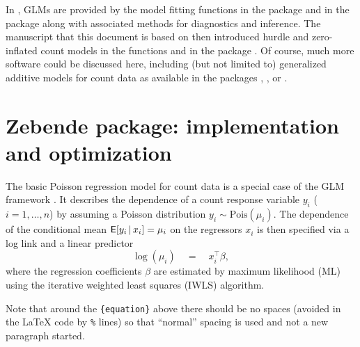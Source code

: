 \documentclass[article]{jss}
\newcommand{\fct}[1]{\code{#1()}}
\begin{document}
In  \citep{R}, GLMs are provided by the model fitting functions
\fct{glm} in the  package and \fct{glm.nb} in the  package
\citep[][Chapter~7.4]{Venables+Ripley:2002} along with associated methods for
diagnostics and inference. The manuscript that this document is based on
\citep{Zeileis+Kleiber+Jackman:2008} then introduced hurdle and zero-inflated
count models in the functions \fct{hurdle} and \fct{zeroinfl} in the 
package \citep{Jackman:2015}. Of course, much more software could be discussed
here, including (but not limited to) generalized additive models for count data
as available in the  packages  \cite{Wood:2006},
 \citep{Stasinopoulos+Rigby:2007}, or  \citep{Yee:2009}.




\section{Zebende package: implementation and optimization} \label{sec:optimization}

The basic Poisson regression model for count data is a special case of the GLM
framework \cite{McCullagh+Nelder:1989}. It describes the dependence of a count
response variable $y_i$ ($i = 1, \dots, n$) by assuming a Poisson distribution
$y_i \sim \mathrm{Pois}(\mu_i)$. The dependence of the conditional mean
$\mathsf{E}[y_i \, | \, x_i] = \mu_i$ on the regressors $x_i$ is then specified via a
log link and a linear predictor
%
\begin{equation} \label{eq:mean}
  \log(\mu_i) \quad = \quad x_i^\top \beta,
\end{equation}
%
where the regression coefficients $\beta$ are estimated by maximum likelihood
(ML) using the iterative weighted least squares (IWLS) algorithm.

\begin{leftbar}
  Note that around the \verb|{equation}| above there should be no spaces (avoided
  in the {\LaTeX} code by \verb|%| lines) so that ``normal'' spacing is used and
  not a new paragraph started.
\end{leftbar}
\end{document}
